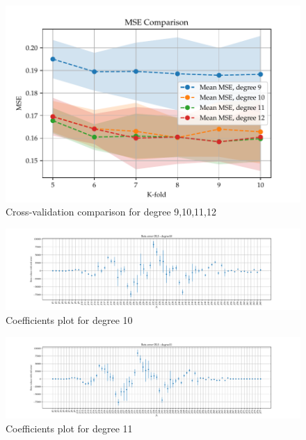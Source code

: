 \documentclass[11pt, a4paper]{article}
\begin{document}
\begin{figure}
  \centering
  \includegraphics[scale=1.0]{figures/EX6_mse_cv_fold_compare_degrees.pdf}
  \caption{Cross-validation comparison for degree 9,10,11,12}
  \label{fig:EX6_1_CV}
\end{figure}


\begin{figure}
  \centering
  \hspace*{-4.2cm}
  \includegraphics[scale=0.52]{figures/EX6_EX1_OLS_beta_error_degree10.pdf}
  \caption{Coefficients plot for degree 10}
  \label{fig:EX6_1_OLS_betas_plot_degree10}
\end{figure}

\begin{figure}
  \centering
  \hspace*{-4.2cm}
  \includegraphics[scale=0.52]{figures/EX6_EX1_OLS_beta_error_degree11.pdf}
  \caption{Coefficients plot for degree 11}
  \label{fig:EX6_1_OLS_betas_plot_degree11}
\end{figure}
\end{document}
